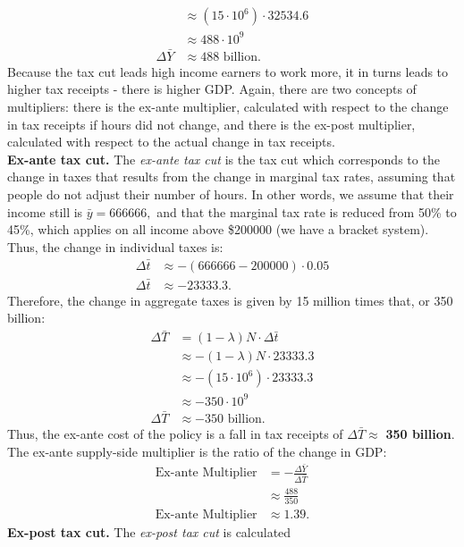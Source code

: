 \documentclass[]{book}
\begin{document}
\begin{enumerate}
\[\begin{aligned}
  & \approx (15 \cdot 10^6) \cdot 32534.6\\
  & \approx 488 \cdot 10^9 \\
  \Delta \bar{Y} & \approx  488 \text{ billion}.
  \end{aligned}
  \] Because the tax cut leads high income earners to work more, it in
  turns leads to higher tax receipts - there is higher GDP. Again, there
  are two concepts of multipliers: there is the ex-ante multiplier,
  calculated with respect to the change in tax receipts if hours did not
  change, and there is the ex-post multiplier, calculated with respect
  to the actual change in tax receipts.\\
  \textbf{Ex-ante tax cut.} The \emph{ex-ante tax cut} is the tax cut
  which corresponds to the change in taxes that results from the change
  in marginal tax rates, assuming that people do not adjust their number
  of hours. In other words, we assume that their income still is
  \(\bar{y}=666666,\) and that the marginal tax rate is reduced from
  50\% to 45\%, which applies on all income above \$200000 (we have a
  bracket system). Thus, the change in individual taxes is: \[
  \begin{aligned}
  \Delta \bar{t} &\approx -(666666-200000) \cdot 0.05 \\
  \Delta \bar{t} &\approx -23333.3.
  \end{aligned}
  \] Therefore, the change in aggregate taxes is given by 15 million
  times that, or 350 billion: \[
  \begin{aligned}
  \Delta \bar{T} &= (1-\lambda) N \cdot \Delta \bar{t}\\
  &\approx  - (1-\lambda) N \cdot 23333.3\\
  & \approx - (15 \cdot 10^6) \cdot 23333.3\\
  & \approx -350 \cdot 10^9 \\
  \Delta \bar{T} & \approx  -350 \text{ billion}.
  \end{aligned}
  \] Thus, the ex-ante cost of the policy is a fall in tax receipts of
  \(\Delta \bar{T} \approx\) \textbf{350 billion}. The ex-ante
  supply-side multiplier is the ratio of the change in GDP: \[
  \begin{aligned}
  \text{Ex-ante Multiplier} &= -\frac{\Delta \bar{Y}}{\Delta \bar{T}}\\
  &  \approx \frac{488}{350}\\
  \text{Ex-ante Multiplier} & \approx 1.39.
  \end{aligned}
  \] \textbf{Ex-post tax cut.} The \emph{ex-post tax cut} is calculated

\end{enumerate}
\end{document}
